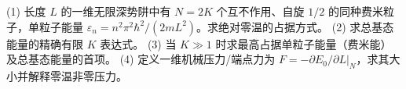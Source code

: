 (1) 长度 \(L\) 的一维无限深势阱中有 \(N=2K\) 个互不作用、自旋 \(1/2\) 的同种费米粒子，单粒子能量 \(\varepsilon_n=n^2\pi^2\hbar^2/(2mL^2)\)。求绝对零温的占据方式。
(2) 求总基态能量的精确有限 \(K\) 表达式。
(3) 当 \(K\gg1\) 时求最高占据单粒子能量（费米能）及总基态能量的首项。
(4) 定义一维机械压力/端点力为 \(F=-\partial E_0/\partial L|_N\)，求其大小并解释零温非零压力。
